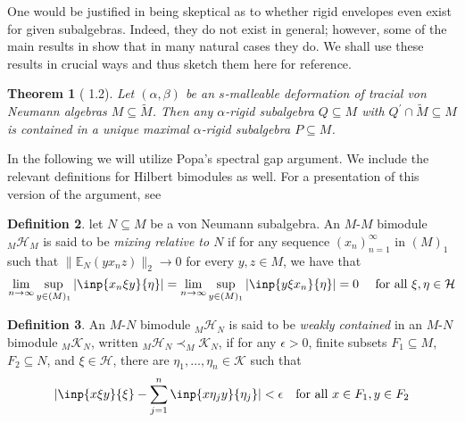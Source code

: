 \documentclass[a4paper,11pt]{article}
\numberwithin{equation}{section}
\newtheorem{thm}{Theorem}[section]
\theoremstyle{definition}
\newtheorem{defn}[thm]{Definition}
\theoremstyle{remark}
\numberwithin{equation}{section}
\newcommand{\E}{\mathbb{E}}
\def\H{\mathcal H}
\def\K{\mathcal K}
\def\sub{\subseteq}
\providecommand{\norm}[1]{\lVert#1\rVert}
\numberwithin{equation}{section}
\begin{document}
One would be justified in being skeptical as to whether rigid envelopes even exist for given subalgebras. Indeed, they do not exist in general; however, some of the main results in \textcite{dSHH:21} show that in many natural cases they do. We shall use these results in crucial ways and thus sketch them here for reference.

\begin{thm}[\textcite{dSHH:21} 1.2] \label{rigenvelope}
  Let $ (\alpha,\beta) $ be an $ s $-malleable deformation of tracial von Neumann algebras $ M\sub \widetilde{M} $. Then any $ \alpha $-rigid subalgebra $ Q\sub M $ with $ Q^{\prime}\cap \widetilde{M}\sub M $ is contained in a unique maximal $ \alpha $-rigid subalgebra $ P\sub M $.
\end{thm}

In the following we will utilize Popa's spectral gap argument. We include the relevant definitions for Hilbert bimodules as well. For a presentation of this version of the argument, see \cite[Theorem 3.2]{hoff:16}

\begin{defn}
    let $ N\subseteq M $ be a von Neumann subalgebra. An $M$-$M$ bimodule $ _M \H_M $ is said to be \textit{mixing relative to $ N $} if for any sequence $ (x_{n})_{n=1}^{\infty} $ in $ (M)_{1} $ such that $ \norm{\E_{N}(yx_{n}z)}_{2} \to 0 $ for every $ y,z\in M $, we have that 
    \[
        \lim_{n\to \infty} \sup_{y\in(M)_{1}}|\inp{x_{n} \xi y}{\eta}| = \lim_{n\to \infty} \sup_{y\in(M)_{1}}|\inp{y \xi x_{n} }{\eta}| = 0 \quad \text{ for all } \xi,\eta\in \H
    \]

\end{defn}

\begin{defn}
    An $ M $-$ N $ bimodule $ _M\H_N $ is said to be \textit{weakly contained} in an $ M $-$ N $ bimodule $ _M\K_N $, written $ _M\H_N \prec _M\K_N$, if for any $ \epsilon>0 $, finite subsets $ F_{1} \sub M $, $ F_{2}\sub N $, and $ \xi\in \H $, there are $ \eta_{1},\ldots, \eta_{n}\in \K $ such that 
    \[
        |\inp{x \xi y}{\xi} - \sum_{j=1}^{n}\inp{x \eta_{j}y }{\eta_{j}} | < \epsilon \quad \text{for all } x\in F_{1}, y\in F_{2}
    \]

\end{defn}
\end{document}

